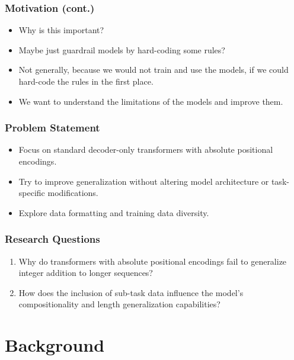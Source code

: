 \documentclass[14pt,aspectratio=169]{beamer}
\theoremstyle{remark}
\begin{document}
\begin{frame}
    \frametitle{Motivation (cont.)}
    \begin{itemize}
        \item Why is this important?
        \item Maybe just guardrail models by hard-coding some rules?
        \item Not generally, because we would not train and use the models, if we could hard-code the rules in the first place.
        \item We want to understand the limitations of the models and improve them.
    \end{itemize}
\end{frame}

\begin{frame}
    \frametitle{Problem Statement}
    \begin{itemize}
        \item Focus on standard decoder-only transformers with absolute positional encodings.
        \item Try to improve generalization without altering model architecture or task-specific modifications.
        \item Explore data formatting and training data diversity.
    \end{itemize}
\end{frame}

\begin{frame}
    \frametitle{Research Questions}
    \begin{enumerate}
        \item Why do transformers with absolute positional encodings fail to generalize integer addition to longer sequences?
        \item How does the inclusion of sub-task data influence the model's compositionality and length generalization capabilities?
    \end{enumerate}
\end{frame}

\section{Background}
\end{document}

